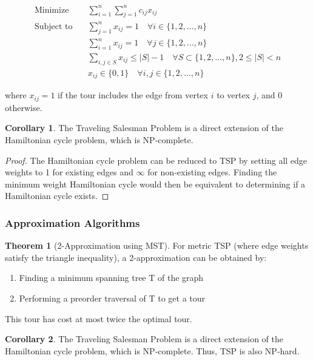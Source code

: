 \documentclass{article}
\theoremstyle{definition}
\newtheorem{theorem}{Theorem}
\newtheorem{corollary}{Corollary}
\begin{document}
\begin{align}
\text{Minimize} \quad & \sum_{i=1}^{n} \sum_{j=1}^{n} c_{ij} x_{ij} \\
\text{Subject to} \quad & \sum_{j=1}^{n} x_{ij} = 1 \quad \forall i \in \{1,2,\ldots,n\} \\
& \sum_{i=1}^{n} x_{ij} = 1 \quad \forall j \in \{1,2,\ldots,n\} \\
& \sum_{i,j \in S} x_{ij} \leq |S| - 1 \quad \forall S \subset \{1,2,\ldots,n\}, 2 \leq |S| < n \\
& x_{ij} \in \{0,1\} \quad \forall i,j \in \{1,2,\ldots,n\}
\end{align}

where $x_{ij} = 1$ if the tour includes the edge from vertex $i$ to vertex $j$, and 0 otherwise.


\begin{corollary}
The Traveling Salesman Problem is a direct extension of the Hamiltonian cycle problem, which is NP-complete.
\end{corollary}

\begin{proof}
The Hamiltonian cycle problem can be reduced to TSP by setting all edge weights to 1 for existing edges and $\infty$ for non-existing edges. Finding the minimum weight Hamiltonian cycle would then be equivalent to determining if a Hamiltonian cycle exists.
\end{proof}


\subsubsection{Approximation Algorithms}
\begin{theorem}[2-Approximation using MST]
For metric TSP (where edge weights satisfy the triangle inequality), a 2-approximation can be obtained by:
\begin{enumerate}
    \item Finding a minimum spanning tree T of the graph
    \item Performing a preorder traversal of T to get a tour
\end{enumerate}
This tour has cost at most twice the optimal tour.
\end{theorem}

\begin{corollary}
The Traveling Salesman Problem is a direct extension of the Hamiltonian cycle problem, which is NP-complete. Thus, TSP is also NP-hard.
\end{corollary}
\end{document}
